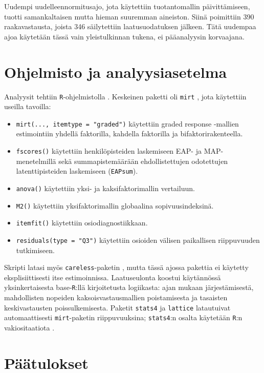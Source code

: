 \documentclass[11pt,a4paper]{article}
\begin{document}
Uudempi uudelleennormitusajo, jota käytettiin tuotantomallin päivittämiseen, tuotti samankaltaisen mutta hieman suuremman aineiston. Siinä poimittiin 390 raakavastausta, joista 346 säilytettiin laatusuodatuksen jälkeen. Tätä uudempaa ajoa käytetään tässä vain yleistulkinnan tukena, ei pääanalyysin korvaajana.

\section{Ohjelmisto ja analyysiasetelma}
Analyysit tehtiin \texttt{R}-ohjelmistolla \parencite{RCore2026}. Keskeinen paketti oli \texttt{mirt} \parencite{Chalmers2012mirt}, jota käytettiin useilla tavoilla:

\begin{itemize}
\item \texttt{mirt(..., itemtype = "graded")} käytettiin graded response -mallien estimointiin yhdellä faktorilla, kahdella faktorilla ja bifaktorirakenteella.
\item \texttt{fscores()} käytettiin henkilöpisteiden laskemiseen EAP- ja MAP-menetelmillä sekä summapistemäärään ehdollistettujen odotettujen latenttipisteiden laskemiseen (\texttt{EAPsum}).
\item \texttt{anova()} käytettiin yksi- ja kaksifaktorimallin vertailuun.
\item \texttt{M2()} käytettiin yksifaktorimallin globaalina sopivuusindeksinä.
\item \texttt{itemfit()} käytettiin osiodiagnostiikkaan.
\item \texttt{residuals(type = "Q3")} käytettiin osioiden välisen paikallisen riippuvuuden tutkimiseen.
\end{itemize}

Skripti latasi myös \texttt{careless}-paketin \parencite{YentesWilhelm2023careless}, mutta tässä ajossa pakettia ei käytetty eksplisiittisesti itse estimoinnissa. Laatuseulonta koostui käytännössä yksinkertaisesta base-\texttt{R}:llä kirjoitetusta logiikasta: ajan mukaan järjestämisestä, mahdollisten nopeiden kaksoisvastausmallien poistamisesta ja tasaisten keskivastausten poissulkemisesta. Paketit \texttt{stats4} ja \texttt{lattice} \parencite{Sarkar2008lattice} latautuivat automaattisesti \texttt{mirt}-paketin riippuvuuksina; \texttt{stats4}:n osalta käytetään \texttt{R}:n vakiositaatiota \parencite{RCore2026}.

\section{Päätulokset}
\end{document}
